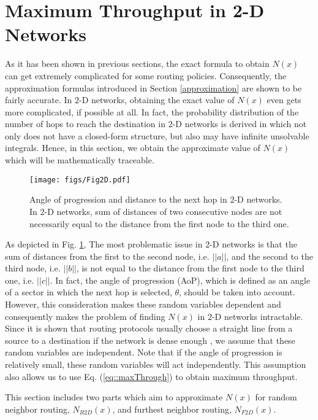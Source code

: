 \documentclass[12pt, draftclsnofoot, onecolumn]{IEEEtran}
\begin{document}
\section{Maximum Throughput in 2-D Networks}
\label{$2$-DSection}

As it has been shown in previous sections, the exact formula 
to obtain $N(x)$ can get extremely complicated for some routing 
policies. Consequently, the approximation formulas introduced in 
Section \ref{approximation} are shown to be fairly accurate. 
In $2$-D networks, obtaining the exact value of $N(x)$ even gets 
more complicated, if possible at all. In fact, the probability distribution 
of the number of hops to reach the destination in $2$-D networks 
is derived in \cite{antunes2015hop} which not only does not have 
a closed-form structure, but also may have infinite unsolvable integrals. 
Hence, in this section, we obtain the approximate value of $N(x)$ 
which will be mathematically traceable.

\begin{figure}
\centering
\texttt{[image: figs/Fig2D.pdf]}
\caption{Angle of progression and distance to the next hop in $2$-D 
networks. In $2$-D networks, sum of distances of two consecutive 
nodes are not necessarily equal to the distance from the first node 
to the third one.}
\label{fig2D}
\end{figure}

As depicted in Fig. \ref{fig2D}, The most problematic issue in $2$-D networks is that the sum of distances 
from the first to the second node, i.e. $||a||$, and the second to the third node, i.e. $||b||$, is not equal to the 
distance from the first node to the third one, i.e. $||c||$.
In fact, the angle of progression (AoP), which is defined as an angle of a sector in 
which the next hop is selected, $\theta$, should be taken into account. However, 
this consideration makes these random variables dependent and consequently makes 
the problem of finding $N(x)$ in $2$-D networks intractable. Since it is shown that 
routing protocols usually choose a straight line from a source to a destination if the 
network is dense enough \cite{straightLine}, we assume that these random variables 
are independent. Note that if the angle of progression is relatively small, these random variables will act independently. This assumption also allows us to use Eq. (\ref{eq::maxThrough}) to obtain maximum throughput.

This section includes two parts which aim to approximate $N(x)$ for random neighbor routing, $N_{R2D}(x)$, and furthest neighbor routing, $N_{F2D}(x)$.
\end{document}
